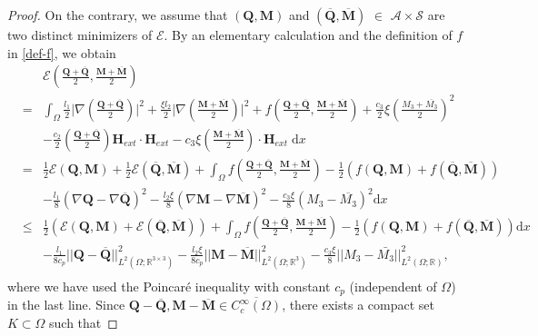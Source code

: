 \documentclass[10pt,a4paper]{amsart}
\def \Mvec{\mathbf{M}}
\def\Hvec{\mathbf{H}}
\def\Qvec{\mathbf{Q}}
\def\d{\mathrm{d}}
\begin{document}
\begin{proof}
On the contrary, we assume that $\left(\Qvec, \Mvec\right)$ and $\left(\overline{\Qvec}, \overline{\Mvec}\right)$ $\in$ $\mathcal{A}\times\mathcal{S}$ are two distinct minimizers of $\mathcal{E}$. By an elementary calculation and the definition of $f$ in \eqref{def-f}, we obtain
\begin{eqnarray}
& &\mathcal{E}\left(\frac{\Qvec+\overline{\Qvec}}{2}, \frac{\Mvec+\overline{\Mvec}}{2}\right)\nonumber\\
&=&\int_{\Omega}\frac{l_1}{2}\bigg|\nabla\left(\frac{\Qvec+\overline{\Qvec}}{2}\right)\bigg|^2 + \frac{\xi l_2}{2}\bigg|\nabla\left(\frac{\Mvec+\overline{\Mvec}}{2}\right)\bigg|^2 + f\left(\frac{\Qvec+\overline{\Qvec}}{2}, \frac{\Mvec+\overline{\Mvec}}{2}\right)+\frac{c_3}{2}\xi\left(\frac{M_3+\overline{M_3}}{2}\right)^2\nonumber\\
& &- \frac{c_2}{2}\left(\frac{\Qvec+\overline{\Qvec}}{2}\right)\Hvec_{ext}\cdot\Hvec_{ext} 
- c_3\xi\left(\frac{\Mvec+\overline{\Mvec}}{2}\right)\cdot\Hvec_{ext}\;\d x\nonumber\\
&=&\frac{1}{2}\mathcal{E}\left(\Qvec, \Mvec\right) + \frac{1}{2}\mathcal{E}\left(\overline{\Qvec}, \overline{\Mvec}\right) + \int_{\Omega}f\left(\frac{\Qvec+\overline{\Qvec}}{2}, \frac{\Mvec+\overline{\Mvec}}{2}\right)-\frac{1}{2}\left(f\left(\Qvec, \Mvec\right) + f\left(\overline{\Qvec}, \overline{\Mvec}\right)\right)\nonumber\\
& &- \frac{l_1}{8}\left(\nabla\Qvec-\nabla\overline{\Qvec}\right)^2-\frac{l_2\xi}{8}\left(\nabla\Mvec-\nabla\overline{\Mvec}\right)^2 - \frac{c_3\xi}{8}\left(M_3-\overline{M_3}\right)^2\d x\nonumber\\
&\le&\frac{1}{2}\left(\mathcal{E}\left(\Qvec, \Mvec\right) + \mathcal{E}\left(\overline{\Qvec}, \overline{\Mvec}\right)\right)+\int_{\Omega}f\left(\frac{\Qvec+\overline{\Qvec}}{2}, \frac{\Mvec+\overline{\Mvec}}{2}\right)-\frac{1}{2}\left(f\left(\Qvec, \Mvec\right) + f\left(\overline{\Qvec}, \overline{\Mvec}\right)\right)\d x\nonumber\\
& &- \frac{l_1}{8c_p}||\Qvec-\overline{\Qvec}||^2_{L^2\left(\Omega; \mathbb R^{3\times 3}\right)} -\frac{l_2\xi}{8c_p}||\Mvec-\overline{\Mvec}||^2_{L^2\left(\Omega; \mathbb R^3\right)} - \frac{c_3\xi}{8}||M_3-\bar{M_3}||^2_{L^2\left(\Omega; \mathbb R\right)},\nonumber\\ \label{eq:un1}
\end{eqnarray}
where we have used the Poincar\'e inequality 
with constant $c_p$ (independent of $\Omega$) in the last line. Since $\Qvec-\overline{\Qvec}, \Mvec-\overline{\Mvec}\in \overline{C^{\infty}_{c}\left(\Omega\right)}$, there exists a compact set $K\subset\Omega$ such that

\end{proof}
\end{document}
